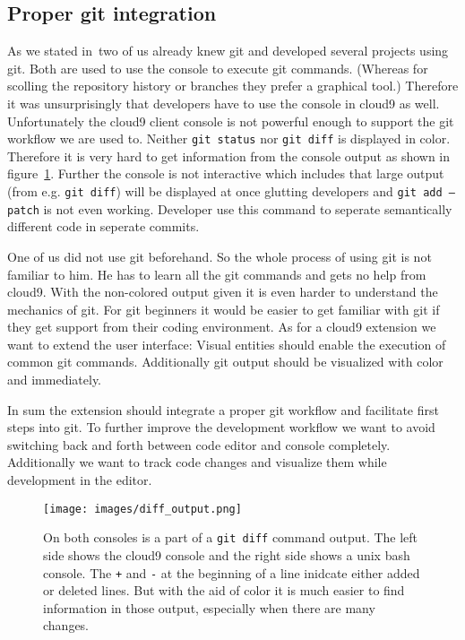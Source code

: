 \subsection{Proper git integration}
\label{subsec:ext_git_integration}
As we stated in~ two of us already knew git and developed several projects using git.
Both are used to use the console to execute git commands.
(Whereas for scolling the repository history or branches they prefer a graphical tool.)
Therefore it was unsurprisingly that developers have to use the console in cloud9 as well.
Unfortunately the cloud9 client console is not powerful enough to support the git workflow we are used to.
Neither \texttt{git status} nor \texttt{git diff} is displayed in color.
Therefore it is very hard to get information from the console output as shown in figure~\ref{fig:diff_output}.
Further the console is not interactive which includes that large output (from e.g. \texttt{git diff}) will be displayed at once glutting developers and \texttt{git add --patch} is not even working.
Developer use this command to seperate semantically different code in seperate commits.

One of us did not use git beforehand.
So the whole process of using git is not familiar to him.
He has to learn all the git commands and gets no help from cloud9.
With the non-colored output given it is even harder to understand the mechanics of git.
For git beginners it would be easier to get familiar with git if they get support from their coding environment.
As for a cloud9 extension we want to extend the user interface: 
Visual entities should enable the execution of common git commands.
Additionally git output should be visualized with color and immediately.

In sum the extension should integrate a proper git workflow and facilitate first steps into git.
To further improve the development workflow we want to avoid switching back and forth between code editor and console completely.
Additionally we want to track code changes and visualize them while development in the editor.

\begin{figure}
   \centering
   \texttt{[image: images/diff\_output.png]}
   \caption{On both consoles is a part of a \texttt{git diff} command output.
   The left side shows the cloud9 console and the right side shows a unix bash console.
   The \texttt{+} and \texttt{-} at the beginning of a line inidcate either added or deleted lines.
   But with the aid of color it is much easier to find information in those output, especially when there are many changes.}
   \label{fig:diff_output}
\end{figure}


